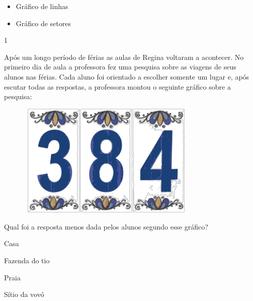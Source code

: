 \begin{multicols}{2}
\begin{enumerate}
{\begin{itemize}
\item
  Gráfico de linhas
\end{itemize}



\begin{itemize}
\item
  Gráfico de setores
\end{itemize}





\num{1}

Após um longo período de férias as aulas de Regina voltaram a acontecer.
No primeiro dia de aula a professora fez uma pesquisa sobre as viagens de seus alunos nas férias. Cada aluno foi
orientado a escolher somente um lugar e, após escutar todas as respostas,
a professora montou o seguinte gráfico sobre a pesquisa:

\includegraphics[width=4.23077in,height=2.15071in]{media/image92.png}

Qual foi a resposta menos dada pelos alunos segundo esse gráfico?

\begin{escolha}
\item
  Casa
\item
  Fazenda do tio
\item
  Praia
\item
  Sítio da vovó
\end{escolha}

}
\end{enumerate}
\end{multicols}
